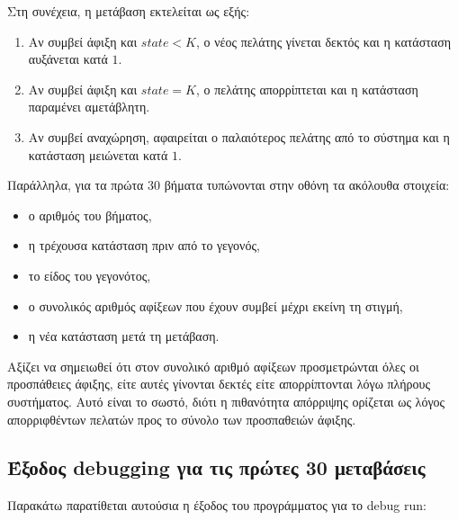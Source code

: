 \documentclass{article}
\begin{document}
Στη συνέχεια, η μετάβαση εκτελείται ως εξής:

\begin{enumerate}[label=\arabic*.]
    \item Αν συμβεί άφιξη και $state < K$, ο νέος πελάτης γίνεται δεκτός και η κατάσταση αυξάνεται κατά $1$.
    \item Αν συμβεί άφιξη και $state = K$, ο πελάτης απορρίπτεται και η κατάσταση παραμένει αμετάβλητη.
    \item Αν συμβεί αναχώρηση, αφαιρείται ο παλαιότερος πελάτης από το σύστημα και η κατάσταση μειώνεται κατά $1$.
\end{enumerate}

Παράλληλα, για τα πρώτα $30$ βήματα τυπώνονται στην οθόνη τα ακόλουθα στοιχεία:

\begin{itemize}
    \item ο αριθμός του βήματος,
    \item η τρέχουσα κατάσταση πριν από το γεγονός,
    \item το είδος του γεγονότος,
    \item ο συνολικός αριθμός αφίξεων που έχουν συμβεί μέχρι εκείνη τη στιγμή,
    \item η νέα κατάσταση μετά τη μετάβαση.
\end{itemize}

Αξίζει να σημειωθεί ότι στον συνολικό αριθμό αφίξεων προσμετρώνται όλες οι προσπάθειες άφιξης, είτε αυτές γίνονται δεκτές είτε απορρίπτονται λόγω πλήρους συστήματος. Αυτό είναι το σωστό, διότι η πιθανότητα απόρριψης ορίζεται ως λόγος απορριφθέντων πελατών προς το σύνολο των προσπαθειών άφιξης.

\subsection{Έξοδος \foreignlanguage{english}{debugging} για τις πρώτες 30 μεταβάσεις}

Παρακάτω παρατίθεται αυτούσια η έξοδος του προγράμματος για το \foreignlanguage{english}{debug} run:
\end{document}
